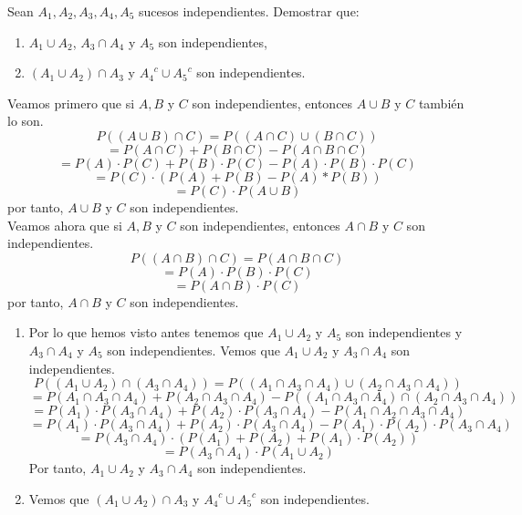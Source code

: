 \begin{ejr}
  Sean $A_{1}, A_{2}, A_{3}, A_{4}, A_{5}$ sucesos independientes. Demostrar que:
  \begin{enumerate}[label=(\roman*)]
    \item $A_{1} \cup A_{2}$, $A_{3} \cap A_{4}$ y $A_{5}$ son independientes,
    \item $(A_{1} \cup A_{2}) \cap A_{3}$ y ${A_{4}}^c \cup {A_{5}}^c$ son independientes.
  \end{enumerate}
\end{ejr}

\begin{sol}
  Veamos primero que si $A, B$ y $C$ son independientes, entonces $A \cup B$ y $C$ también lo son.
  \[ 
    P((A \cup B) \cap C) = P((A \cap C) \cup (B \cap C))  
  \] 
  \[ 
    = P(A \cap C) + P(B \cap C) - P(A \cap B \cap C) 
  \]
  \[ 
    = P(A) \cdot P(C) + P(B) \cdot P(C) - P(A) \cdot P(B) \cdot P(C) 
  \] 
  \[ 
    = P(C) \cdot (P(A) + P(B) - P(A) * P(B)) 
  \] 
  \[ 
    = P(C)\cdot P(A \cup B) 
  \] 
  por tanto, $A \cup B$ y $C$ son independientes. \\

  Veamos ahora que si $A, B$ y $C$ son independientes, entonces $A \cap B$ y $C$ son independientes.
  \[ 
    P((A \cap B) \cap C) = P(A \cap B \cap C) 
  \] 
  \[ 
    = P(A) \cdot P(B) \cdot P(C) 
  \] 
  \[ 
    = P(A \cap B) \cdot P(C) 
  \] 
  por tanto, $A \cap B$ y $C$ son independientes.

  \begin{enumerate}[label=(\roman*)]
    \item Por lo que hemos visto antes tenemos que $A_{1} \cup A_{2}$ y $A_{5}$ son independientes y $A_{3} \cap A_{4}$ y $A_{5}$ son independientes. Vemos que $A_{1} \cup A_{2}$ y $A_{3} \cap A_{4}$ son independientes. 
      \[ 
        P((A_{1}\cup A_{2}) \cap (A_{3} \cap A_{4})) = P((A_{1} \cap A_{3} \cap A_{4}) \cup (A_{2} \cap A_{3} \cap A_{4})) 
      \] 
      \[ 
        = P(A_{1} \cap A_{3} \cap A_{4}) + P(A_{2} \cap A_{3} \cap A_{4}) - P((A_{1} \cap A_{3} \cap A_{4}) \cap (A_{2} \cap A_{3} \cap A_{4})) 
      \] 
      \[ 
        =P(A_{1}) \cdot P(A_{3} \cap A_{4}) + P(A_{2}) \cdot P(A_{3} \cap A_{4}) - P(A_{1} \cap A_{2} \cap A_{3} \cap A_{4})
      \] 
      \[ 
        =P(A_{1}) \cdot P(A_{3} \cap A_{4}) + P(A_{2}) \cdot P(A_{3} \cap A_{4}) - P(A_{1}) \cdot P(A_{2}) \cdot P(A_{3} \cap A_{4})
      \] 
      \[ 
        = P(A_{3} \cap A_{4}) \cdot (P(A_{1}) + P(A_{2}) + P(A_{1}) \cdot P(A_{2})) 
      \] 
      \[ 
        = P(A_{3} \cap A_{4}) \cdot P(A_{1} \cup A_{2}) 
      \] 
      Por tanto, $A_{1} \cup A_{2}$ y $A_{3} \cap A_{4}$ son independientes. 
    \item Vemos que $(A_{1} \cup A_{2}) \cap A_{3}$ y ${A_{4}}^c \cup {A_{5}}^c$ son independientes.


\end{enumerate}
\end{sol}
